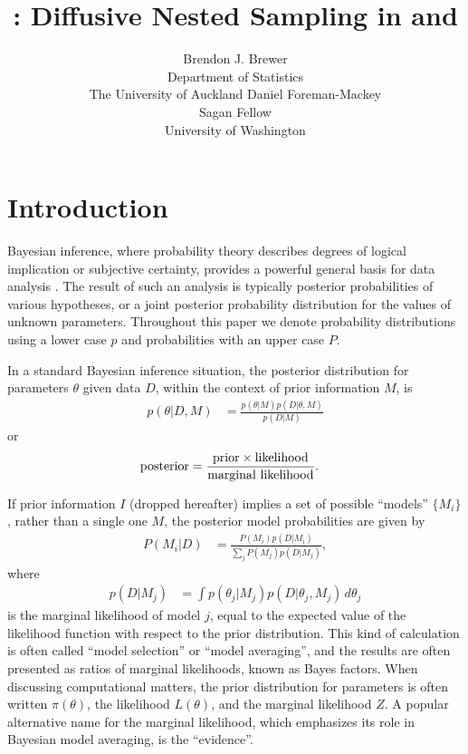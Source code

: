 \documentclass[article]{jss}
\author{Brendon J. Brewer\\Department of Statistics\\The University of Auckland\And 
        Daniel Foreman-Mackey\\Sagan Fellow\\University of Washington}
\title{\pkg{DNest4}: Diffusive Nested Sampling in
\proglang{C++} and \proglang{Python}}
\newcommand{\params}{\theta}
\newcommand{\data}{D}
\begin{document}
\maketitle


\section{Introduction}
Bayesian inference, where probability theory describes degrees of
logical implication or subjective certainty, provides a powerful general basis
for data analysis \citep{o2004kendall, sivia2006data}. The result of such
an analysis is typically
posterior probabilities of various hypotheses, or
a joint posterior probability distribution for the values of unknown
parameters. Throughout this paper we denote probability distributions
using a lower case $p$ and probabilities with an upper case $P$.

In a standard Bayesian inference situation, the posterior distribution for
parameters $\params$ given data $\data$, within the context of prior
information $M$, is
\begin{align*}
p(\params | \data, M) &=
\frac{p(\params | M)p(\data | \params, M)}{p(\data | M)}
\end{align*}
or
\begin{align*}
\textnormal{posterior} &=
\frac{\textnormal{prior} \times \textnormal{likelihood}}
     {\textnormal{marginal likelihood}}.
\end{align*}

If prior information $I$ (dropped hereafter)
implies a set of possible ``models'' $\{M_i\}$,
rather than a single one $M$, the posterior model probabilities are given by
\begin{align*}
P(M_i | \data) &=
\frac{P(M_i)p(\data | M_i)}{\sum_j P(M_j)p(\data | M_j)},
\end{align*}
where
\begin{align*}
p(\data | M_j) &= \int p(\theta_j | M_j)p(\data | \theta_j, M_j) \, d\theta_j
\end{align*}
is the marginal likelihood of model $j$, equal to the expected value of the
likelihood function with respect to the prior distribution.
This kind of calculation is often
called ``model selection'' or ``model averaging'', and the results
are often presented as ratios
of marginal likelihoods, known as Bayes factors.
When discussing computational matters, the prior distribution for parameters
is
often written $\pi(\theta)$, the likelihood $L(\theta)$,
and the marginal likelihood $Z$. A popular alternative name for the marginal
likelihood, which emphasizes its role in Bayesian model averaging,
is the ``evidence''.
\end{document}
